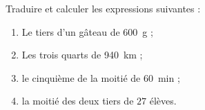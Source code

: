
\begin{exercice}\label{exo2smath-0192}

Traduire et calculer les expressions suivantes :
\begin{enumerate}
    \item
        Le tiers d'un gâteau de \SI{600}{\gram} ;
 \item
     Les trois quarts de \SI{940}{\kilo\meter} ;
 \item
     le cinquième de la moitié de \SI{60}{\minute} ;
 \item
 la moitié des deux tiers de $27$ élèves.
\end{enumerate}


\end{exercice}
